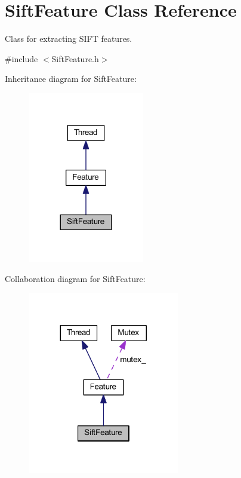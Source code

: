 \hypertarget{class_sift_feature}{\section{Sift\-Feature Class Reference}
\label{class_sift_feature}
}


Class for extracting S\-I\-F\-T features.  




{\ttfamily \#include $<$Sift\-Feature.\-h$>$}



Inheritance diagram for Sift\-Feature\-:
\nopagebreak
\begin{figure}[H]
\begin{center}
\leavevmode
\includegraphics[width=144pt]{class_sift_feature__inherit__graph}
\end{center}
\end{figure}


Collaboration diagram for Sift\-Feature\-:
\nopagebreak
\begin{figure}[H]
\begin{center}
\leavevmode
\includegraphics[width=188pt]{class_sift_feature__coll__graph}
\end{center}
\end{figure}
